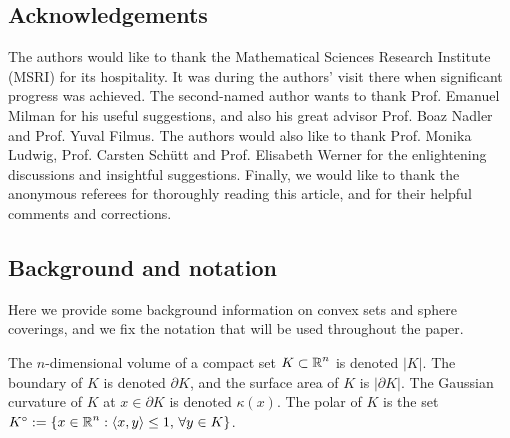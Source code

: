 


\subsection*{Acknowledgements}
		The authors would like to thank the Mathematical Sciences Research Institute (MSRI) for its hospitality. It was during the authors' visit there when significant progress was achieved. The second-named author wants to thank Prof. Emanuel Milman for his useful suggestions, and also his great advisor Prof. Boaz Nadler and Prof. Yuval Filmus. The authors would also like to thank Prof. Monika Ludwig, Prof. Carsten Sch\"utt and Prof. Elisabeth Werner for the enlightening discussions and insightful suggestions.
		 Finally, we would like to thank the anonymous referees for  thoroughly reading this article, and for their helpful comments and corrections.
		

\subsection*{Background and notation}

Here we provide some background information on convex sets and sphere coverings, and we fix the notation that will be used throughout the paper. 

\vspace{2mm}

The $n$-dimensional volume of a compact set $K\subset \operatorname{\mathbb{R}}^n$ is denoted $|K|$. The boundary of $K$ is denoted $\partial K$, and the surface area of $K$ is $|\partial K|$. The Gaussian curvature of $K$ at $x\in\partial K$ is denoted $\kappa(x)$. 
The polar of $K$ is the set $K^\circ:=\{x\in\operatorname{\mathbb{R}}^n: \langle x,y\rangle \leq 1, \,\forall y\in K\}$. %

